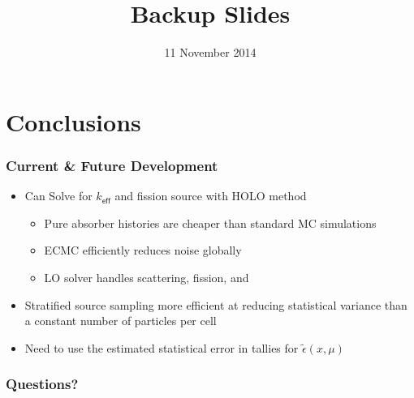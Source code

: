 \documentclass[xcolor=dvipsnames,handout,unknownkeysallowed]{beamer}
\newcommand{\keff}[0]{\ensuremath{{k}_{\textsf{eff}}} }
\newcommand{\coly}[1]{{\color{yellow} #1}}
\newlength{\wideitemsep}
\let\olditem\item
\renewcommand{\item}{\setlength{\itemsep}{\wideitemsep}\olditem}
\begin{document}
\begin{frame}
\end{frame}

\section{Conclusions}

\begin{frame}
    \frametitle{Current \& Future Development}
    \begin{itemize}
        \item Can Solve for $\keff$ and fission source with HOLO method
        \begin{itemize}
            \item Pure absorber histories are cheaper than standard MC simulations
            \item ECMC efficiently reduces noise globally 
            \item LO solver handles scattering, fission, and 
        \end{itemize}
        \item Stratified source sampling more efficient at reducing statistical
            variance than a constant number of particles per cell
        \item Need to use the estimated statistical error in tallies for $\tilde\epsilon(x,\mu)$ 
    \end{itemize}

\end{frame}


\date{11 November 2014}

\begin{frame}
    \frametitle{{\LARGE\coly{Questions?}}}
    \titlepage \vspace{-0.113in}
\end{frame}

\appendix

\title{Backup Slides}
\author{}
\date{}

\begin{frame}
    \titlepage
\end{frame}
\end{document}
